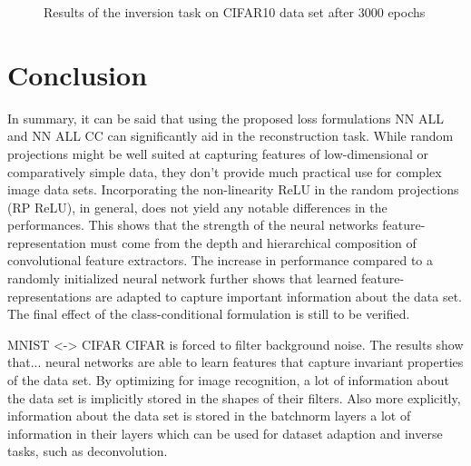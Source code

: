 \begin{figure}[H]
    \centering
    
    
    \caption{Results of the inversion task on CIFAR10 data set after 3000 epochs}
    \label{fig:CIFAR_Images_Inversion}
\end{figure}





\chapter{Conclusion}

In summary, it can be said that using the proposed loss formulations 
NN ALL and NN ALL CC can significantly 
aid in the reconstruction task.
While random projections might be 
well suited at capturing features 
of low-dimensional or comparatively simple data, 
they don't provide much practical use for complex image data sets.
Incorporating the non-linearity ReLU in the random projections (RP ReLU), in general, 
does not yield any notable differences in the performances.
This shows that the strength of the neural networks feature-representation
must come from the depth and hierarchical composition of convolutional feature extractors.
The increase in performance compared to a randomly initialized neural network
further shows that learned feature-representations are adapted to capture
important information about the data set.
The final effect of the class-conditional formulation is still to be verified.


MNIST <-> CIFAR 
CIFAR is forced to filter background noise.
The results show that...
neural networks are able to learn features that 
capture invariant properties of the data set.
By optimizing for image recognition, a lot of information
about the data set is implicitly stored in the shapes of their filters.
Also more explicitly, information about the data set is stored in the batchnorm layers
a lot of information in their layers
which can be used for dataset adaption and inverse tasks, such as deconvolution.













